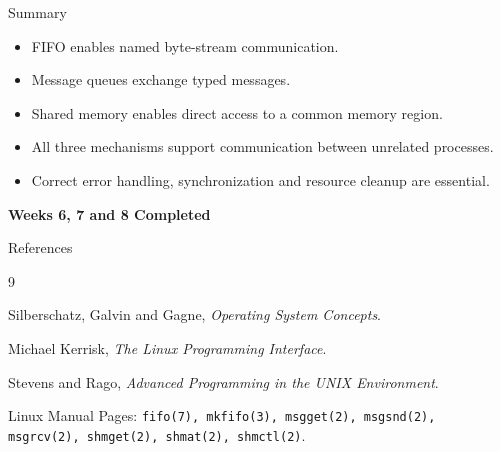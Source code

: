\documentclass[aspectratio=169,10pt]{beamer}
\begin{document}
\begin{frame}{Summary}

\begin{itemize}
    \item FIFO enables named byte-stream communication.
    \item Message queues exchange typed messages.
    \item Shared memory enables direct access
    to a common memory region.
    \item All three mechanisms support
    communication between unrelated processes.
    \item Correct error handling, synchronization
    and resource cleanup are essential.
\end{itemize}

\vspace{0.4cm}

\begin{center}
\Large\bfseries
Weeks 6, 7 and 8 Completed
\end{center}

\end{frame}

\begin{frame}{References}

\small

\begin{thebibliography}{9}

Silberschatz, Galvin and Gagne,
\newblock \emph{Operating System Concepts}.

Michael Kerrisk,
\newblock \emph{The Linux Programming Interface}.

Stevens and Rago,
\newblock \emph{Advanced Programming in
the UNIX Environment}.

Linux Manual Pages:
\newblock \texttt{fifo(7), mkfifo(3),
msgget(2), msgsnd(2), msgrcv(2),
shmget(2), shmat(2), shmctl(2)}.

\end{thebibliography}

\end{frame}
\end{document}
